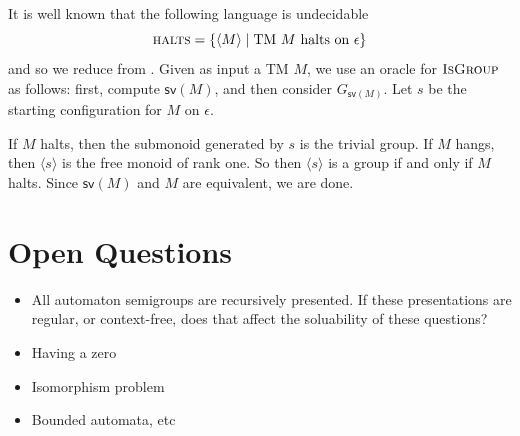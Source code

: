 \documentclass[11pt]{article}
\begin{document}
It is well known that the following language is undecidable
\[
  \textsc{halts} = \{\langle M \rangle \mid \text{TM $M$ halts on
    $\epsilon$} \}
\]
and so we reduce from . Given as input a TM $M$, we use
an oracle for $\textsc{IsGroup}$ as follows: first, compute
$\textsf{sv}(M)$, and then consider $G_{\textsf{sv}(M)}$. Let $s$ be
the starting configuration for $M$ on $\epsilon$.

If $M$ halts, then the submonoid generated by $s$ is the trivial
group. If $M$ hangs, then $\langle s \rangle$ is the free monoid of
rank one. So then $\langle s \rangle$ is a group if and only if $M$
halts. Since $\textsf{sv}(M)$ and $M$ are equivalent, we are done.

\section{Open Questions}

\begin{itemize}
\item All automaton semigroups are recursively presented. If these
  presentations are regular, or context-free, does that affect the
  soluability of these questions?
\item Having a zero
\item Isomorphism problem
\item Bounded automata, etc
\end{itemize}

\nocite{*}

\end{document}
